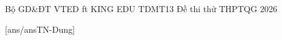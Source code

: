 \def\linkdethi{} %
\anmaQR
\def\toanlop{12}
\def\thoigian{90}
\def\namhoc{2025 - 2026}
\begin{dethi}
	{Bộ GD\&ĐT}
	{VTED ft KING EDU}
	{TDMT13}
	{Đề thi thử THPTQG 2026}
\end{dethi}
\caulc
{}[ans/ansTN-Dung]
%
%
